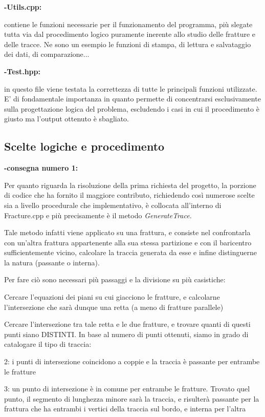 \textbf{-Utils.cpp:}

contiene le funzioni necessarie per il funzionamento del programma, più slegate tutta via dal procedimento logico puramente inerente allo studio delle fratture e delle tracce. Ne sono un esempio le funzioni di stampa, di lettura e salvataggio dei dati, di comparazione...

\textbf{-Test.hpp:}

in questo file viene testata la correttezza di tutte le principali funzioni utilizzate. E' di fondamentale importanza in quanto permette di concentrarsi esclusivamente sulla progettazione logica del problema, escludendo i casi in cui il procedimento è giusto ma l'output ottenuto è sbagliato.



\subsection{Scelte logiche e procedimento}


\textbf{-consegna numero 1:}


Per quanto riguarda la risoluzione della prima richiesta del progetto, la porzione di codice che ha fornito il maggiore contributo, richiedendo così numerose scelte sia a livello procedurale che implementativo, è collocata all'interno di Fracture.cpp e più precisamente è il metodo \textit{GenerateTrace}. \newline


Tale metodo infatti viene applicato su una frattura, e consiste nel confrontarla con un'altra frattura appartenente alla sua stessa partizione e con il baricentro sufficientemente vicino, calcolare la traccia generata da esse e infine distinguerne la natura (passante o interna).

Per fare ciò sono necessari più passaggi e la divisione su più casistiche:

Cercare l'equazioni dei piani su cui giacciono le fratture, e calcolarne l'intersezione che sarà dunque una retta (a meno di fratture parallele)

Cercare l'intersezione tra tale retta e le due fratture, e trovare quanti di questi punti siano DISTINTI. In base al numero di punti ottenuti, siamo in grado di catalogare il tipo di traccia:

2: i punti di intersezione coincidono a coppie e la traccia è passante per entrambe le fratture

3: un punto di intersezione è in comune per entrambe le fratture. Trovato quel punto, il segmento di lunghezza minore sarà la traccia, e risulterà passante per la frattura che ha entrambi i vertici della traccia sul bordo, e interna per l'altra

